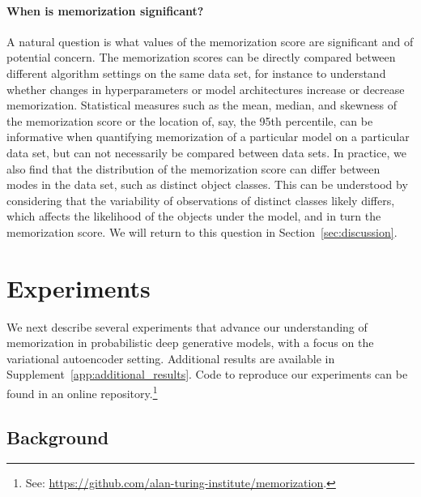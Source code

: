\documentclass{article}
\begin{document}
\paragraph{When is memorization significant?} A natural question is what 
values of the memorization score are significant and of potential concern. The 
memorization scores can be directly compared between different algorithm 
settings on the same data set, for instance to understand whether changes in 
hyperparameters or model architectures increase or decrease memorization.  
Statistical measures such as the mean, median, and skewness of the 
memorization score or the location of, say, the 95th percentile, can be 
informative when quantifying memorization of a particular model on a 
particular data set, but can not necessarily be compared between data sets.  
In practice, we also find that the distribution of the memorization score can 
differ between modes in the data set, such as distinct object classes. This 
can be understood by considering that the variability of observations of 
distinct classes likely differs, which affects the likelihood of the objects 
under the model, and in turn the memorization score. We will return to this 
question in Section~\ref{sec:discussion}.

\section{Experiments}
\label{sec:experiments}

We next describe several experiments that advance our understanding of 
memorization in probabilistic deep generative models, with a focus on the 
variational autoencoder setting. Additional results are available in 
Supplement~\ref{app:additional_results}. Code to reproduce our experiments can 
be found in an online repository.\footnote{See: 
	\url{https://github.com/alan-turing-institute/memorization}.}

\subsection{Background}
\end{document}
